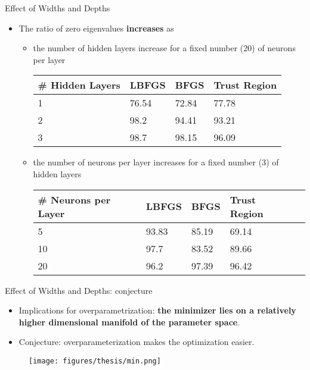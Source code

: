 \documentclass[usenames,dvipsnames]{beamer}
\begin{document}
\begin{frame}{Effect of Widths and Depths}

\begin{itemize}
\item The ratio of zero eigenvalues \textbf{increases} as

\begin{itemize}
\item the number of hidden layers increase for a fixed number (20) of neurons per layer
\begin{center}
\begin{tabular}{@{}llll@{}}
	\toprule
	\# Hidden   Layers &  LBFGS & BFGS  & Trust Region \\ \midrule
	1                         & 76.54 & 72.84 & 77.78        \\
	2                        & 98.2  & 94.41 & 93.21        \\
	3                         & 98.7  & 98.15 & 96.09        \\ \bottomrule
\end{tabular}
\end{center}

\item the number of neurons per layer increases for a fixed number (3) of hidden layers
\begin{center}
	\begin{tabular}{@{}lllll@{}}
		\toprule
		\# Neurons per Layer & LBFGS & BFGS  & Trust Region \\ \midrule
		5                         & 93.83 & 85.19 & 69.14        \\
		10                         & 97.7  & 83.52 & 89.66        \\
		20                        & 96.2  & 97.39 & 96.42        \\ \bottomrule
	\end{tabular}
\end{center}
\end{itemize}
\end{itemize}

\end{frame}


\begin{frame}{Effect of Widths and Depths: conjecture}
\begin{itemize}
\item Implications for overparametrization: \textbf{the minimizer lies on a relatively higher dimensional manifold of the parameter space}.
\item Conjecture: overparameterization makes the optimization easier. 
\end{itemize}

	\begin{figure}[htbp]
	\centering
	\texttt{[image: figures/thesis/min.png]}
\end{figure}
\end{frame}
\end{document}
